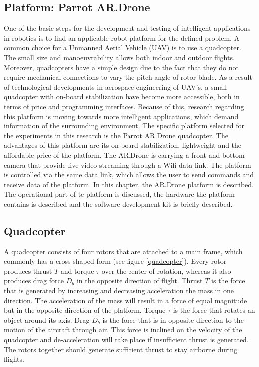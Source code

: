 \documentclass[a4paper]{article}
\begin{document}
\begin{appendices}
\newpage

\section{Platform: Parrot AR.Drone}
\label{PLATFORM}
One of the basic steps for the development and testing of intelligent applications in robotics is to find an applicable robot platform for the defined problem. A common choice for a Unmanned Aerial Vehicle (UAV) is to use a quadcopter. The small size and manoeuvrability allows both indoor and outdoor flights. Moreover, quadcopters have a simple design due to the fact that they do not require mechanical connections to vary the pitch angle of rotor blade.
As a result of technological developments in aerospace engineering of UAV's, a small quadcopter with on-board stabilization have become more accessible, both in terms of price and programming interfaces. Because of this, research regarding this platform is moving towards more intelligent applications, which demand information of the surrounding environment. The specific platform selected for the experiments in this research is the Parrot AR.Drone quadcopter. The advantages of this platform are its on-board stabilization, lightweight and the affordable price of the platform. The AR.Drone is carrying a front and bottom camera that provide live video streaming through a Wifi data link.  The platform is controlled via the same data link, which allows the user to send commands and receive data of the platform.
In this chapter, the AR.Drone platform is described. The operational part of te platform is discussed, the hardware the platform contains is described and the software development kit is briefly described.

\subsection{Quadcopter}
A quadcopter consists of four rotors that are attached to a main frame, which commonly has a cross-shaped form (see figure \ref{quadcopter}). Every rotor produces thrust $T$ and torque $\tau$ over the center of rotation, whereas it also produces drag force $D_b$ in the opposite direction of flight. Thrust $T$ is the force that is generated by increasing and decreasing acceleration the mass in one direction. The acceleration of the mass will result in a force of equal magnitude but in the opposite direction of the platform. Torque $\tau$ is the force that rotates an object around its axis. Drag $D_b$ is the force that is in opposite direction to the motion of the aircraft through air. This force is inclined on the velocity of the quadcopter and de-acceleration will take place if insufficient thrust is generated. The rotors together should generate sufficient thrust to stay airborne during flights.


\end{appendices}
\end{document}
